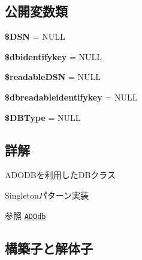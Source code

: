 \subsection*{公開変数類}
\begin{DoxyCompactItemize}
\item 
\hypertarget{class_generic_d_b_o_af955474f4d730b49664c8d96a26eb1b9}{}{\bfseries \$\+D\+S\+N} = N\+U\+L\+L\label{class_generic_d_b_o_af955474f4d730b49664c8d96a26eb1b9}

\item 
\hypertarget{class_generic_d_b_o_a2c278bc73bb2397b13eb9cfc3165036d}{}{\bfseries \$dbidentifykey} = N\+U\+L\+L\label{class_generic_d_b_o_a2c278bc73bb2397b13eb9cfc3165036d}

\item 
\hypertarget{class_generic_d_b_o_a01d607641995bcc6ab506cbb3b1aca98}{}{\bfseries \$readable\+D\+S\+N} = N\+U\+L\+L\label{class_generic_d_b_o_a01d607641995bcc6ab506cbb3b1aca98}

\item 
\hypertarget{class_generic_d_b_o_a8015daddc80026848dd483c735f6ffc9}{}{\bfseries \$dbreadableidentifykey} = N\+U\+L\+L\label{class_generic_d_b_o_a8015daddc80026848dd483c735f6ffc9}

\item 
\hypertarget{class_generic_d_b_o_a75ce49a8a41a3ef127e8ef785f777038}{}{\bfseries \$\+D\+B\+Type} = N\+U\+L\+L\label{class_generic_d_b_o_a75ce49a8a41a3ef127e8ef785f777038}

\end{DoxyCompactItemize}


\subsection{詳解}
A\+D\+O\+D\+Bを利用した\+D\+Bクラス

Singletonパターン実装 \begin{DoxySeeAlso}{参照}
\href{http://adodb.sourceforge.net/}{\tt A\+D\+Odb} 
\end{DoxySeeAlso}


\subsection{構築子と解体子}
\hypertarget{class_generic_d_b_o_a43687f2b92b21e709336c42b140b2260}{}
